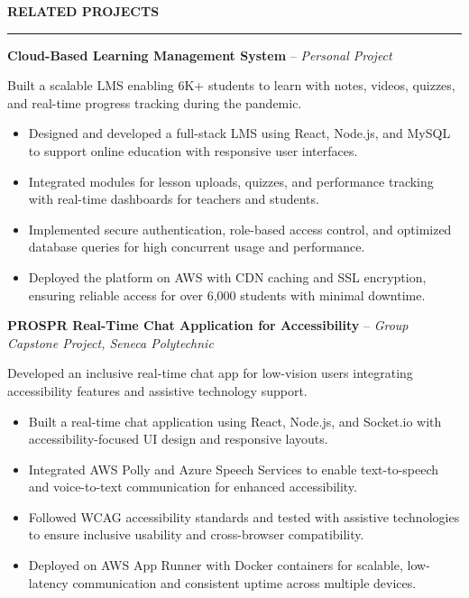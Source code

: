 \documentclass[10pt,letterpaper]{article}
\begin{document}
\vspace{6pt}

\textbf{RELATED PROJECTS}\\[-8pt]
\noindent\rule{\textwidth}{1pt}

\vspace{-2pt}

\textbf{Cloud-Based Learning Management System} -- \emph{Personal Project}

\vspace{-1pt}

Built a scalable LMS enabling 6K+ students to learn with notes, videos, quizzes, and real-time progress tracking during the pandemic.
\vspace{-1pt}
\begin{itemize}
\item Designed and developed a full-stack LMS using React, Node.js, and MySQL to support online education with responsive user interfaces.
\item Integrated modules for lesson uploads, quizzes, and performance tracking with real-time dashboards for teachers and students.
\item Implemented secure authentication, role-based access control, and optimized database queries for high concurrent usage and performance.
\item Deployed the platform on AWS with CDN caching and SSL encryption, ensuring reliable access for over 6,000 students with minimal downtime.
\end{itemize}

\textbf{PROSPR  Real-Time Chat Application for Accessibility} -- \emph{Group Capstone Project, Seneca Polytechnic}

\vspace{-1pt}

Developed an inclusive real-time chat app for low-vision users integrating accessibility features and assistive technology support.
\vspace{-1pt}
\begin{itemize}
\item Built a real-time chat application using React, Node.js, and Socket.io with accessibility-focused UI design and responsive layouts.
\item Integrated AWS Polly and Azure Speech Services to enable text-to-speech and voice-to-text communication for enhanced accessibility.
\item Followed WCAG accessibility standards and tested with assistive technologies to ensure inclusive usability and cross-browser compatibility.
\item Deployed on AWS App Runner with Docker containers for scalable, low-latency communication and consistent uptime across multiple devices.
\end{itemize}
\end{document}

